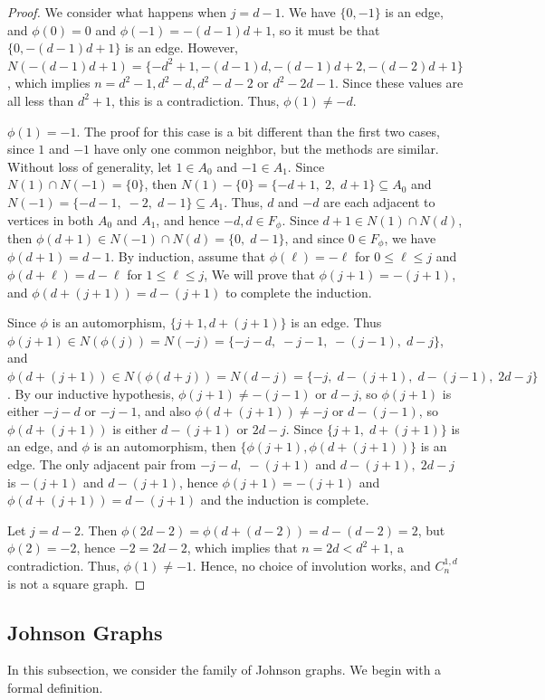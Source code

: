 \documentclass{article}
\theoremstyle{definition}
\begin{document}
\begin{proof}
We consider what happens when $j=d-1$. We have $\{0,-1\}$ is an edge, and $\phi(0)=0$ and $\phi(-1)=-(d-1)d+1$, so it must be that $\{0, -(d-1)d+1\}$ is an edge. 
However, $N(-(d-1)d+1) =\{-d^2+1, -(d-1)d, -(d-1)d+2, -(d-2)d+1\}$, which implies  
$n=d^2-1, d^2-d, d^2-d-2$ or $d^2-2d-1$. Since these values are all less than $d^2+1$, this is a contradiction. 
Thus, $\phi(1)\neq -d$. 

 $\phi(1)=-1$. The proof for this case is a bit different than the first two cases, since $1$ and $-1$ have only one common neighbor, but the methods are similar. Without loss of generality, let $1\in A_0$ and $-1\in A_{1}$. 
Since $N(1)\cap N(-1)=\{0\}$, then $N(1)-\{0\}=\{-d+1,\; 2,\; d+1\}\subseteq A_0$ and $N(-1)=\{-d-1,\;-2,\; d-1\}\subseteq A_1$. 
Thus, $d$ and $-d$ are each adjacent to vertices in both $A_0$ and $A_1$, and hence $-d,d\in F_{\phi}$. Since $d+1\in N(1)\cap N(d)$, then $\phi(d+1)\in N(-1)\cap N(d)=\{0,\; d-1\}$, and since $0\in F_{\phi}$, we have $\phi(d+1)=d-1$. 
By induction, assume that $\phi(\ell)=-\ell$ for $0\leq \ell \leq j$ and $\phi(d+\ell)=d-\ell$ for $1\leq \ell\leq j$, 
We will prove that $\phi(j+1)=-(j+1)$, and $\phi(d+(j+1))=d-(j+1)$ to complete the induction. 

Since $\phi$ is an automorphism, $\{j+1, d+(j+1)\}$ is an edge. Thus $\phi(j+1)\in N(\phi(j))=N(-j)=\{-j-d,\;-j-1,\;-(j-1),\;d-j\}$, and 
$\phi(d+(j+1))\in N(\phi(d+j))=N(d-j)=\{-j,\;d-(j+1),\;d-(j-1),\;2d-j\}$. By our inductive hypothesis, $\phi(j+1)\neq -(j-1)$ or $d-j $, so $\phi(j+1)$ is either $-j-d$ or $-j-1$, and also $\phi(d+(j+1))\neq -j $ or $d-(j-1)$, so
$\phi(d+(j+1))$ is either $d-(j+1)$ or $2d-j$. 
Since $\{j+1,\; d+(j+1)\}$ is an edge, and $\phi$ is an automorphism, then $\{\phi(j+1),\phi(d+(j+1))\}$ is an edge. 
The only adjacent pair from $-j-d,\; -(j+1)$ and $d-(j+1), \;2d-j$ is 
$-(j+1)$ and $d-(j+1)$, hence $\phi(j+1)=-(j+1)$ and $\phi(d+(j+1))=d-(j+1)$ and the induction is complete. 

Let $j=d-2$. Then $\phi(2d-2)=\phi(d+(d-2))=d-(d-2)=2$, but $\phi(2) =-2$, hence $-2=2d-2$, which implies that $n=2d<d^2+1$, a contradiction. Thus, $\phi(1)\neq -1$. Hence, no choice of involution works, and $C_{n}^{1,d}$
is not a square graph. 
\end{proof} 



\subsection{Johnson Graphs} In this subsection, we consider the family of Johnson graphs. We begin with a formal definition.
\end{document}
